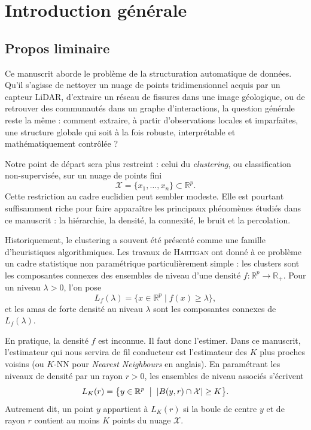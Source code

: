 \chapter{Introduction générale}
\label{sec:Introduction}


\section{Propos liminaire}

Ce manuscrit aborde le problème de la structuration automatique de données.
Qu'il s'agisse de nettoyer un nuage de points tridimensionnel acquis par un
capteur LiDAR, d'extraire un réseau de fissures dans une image géologique, ou de retrouver des communautés dans un graphe d'interactions, la question générale reste la même : comment extraire, à partir d'observations locales et imparfaites, une structure globale qui soit à la fois robuste, interprétable et mathématiquement contrôlée ?

Notre point de départ sera plus restreint : celui du \emph{clustering}, ou classification non-supervisée, sur un nuage de points fini
\[
    \mathcal X = \bigl\{x_1,\ldots,x_n\bigr\} \subset \mathbb{R}^p.
\]
Cette restriction au cadre euclidien peut sembler modeste. Elle est pourtant suffisamment riche pour faire apparaître les principaux phénomènes étudiés dans ce manuscrit : la hiérarchie, la densité, la connexité, le bruit et la percolation.

Historiquement, le clustering a souvent été présenté comme une famille d'heuristiques algorithmiques. Les travaux de \textsc{Hartigan} ont donné à ce problème un cadre statistique non paramétrique particulièrement simple : les clusters sont les composantes connexes des ensembles de niveau d'une densité
$f : \mathbb{R}^p \to \mathbb{R}_+$. Pour un niveau $\lambda > 0$, l'on pose
\[
    L_f(\lambda)
    =
    \{x \in \mathbb{R}^p \mid f(x) \geq \lambda\},
\]
et les amas de forte densité au niveau $\lambda$ sont les composantes connexes de $L_f(\lambda)$.

En pratique, la densité $f$ est inconnue. Il faut donc l'estimer. Dans ce manuscrit, l'estimateur qui nous servira de fil conducteur est l'estimateur des $K$ plus proches voisins (ou $K$-NN pour \emph{Nearest Neighbours} en anglais). En paramétrant les niveaux de densité par un rayon $r>0$, les ensembles de niveau associés s'écrivent
\[
    L_K(r)
    =
    \bigl\{
        y\in\mathbb{R}^p
        \;\bigm|\;
        \lvert B(y,r)\cap \mathcal X \rvert \geq K
    \bigr\}.
\]
Autrement dit, un point $y$ appartient à $L_K(r)$ si la boule de centre $y$ et de rayon $r$ contient au moins $K$ points du nuage $\mathcal X$.

